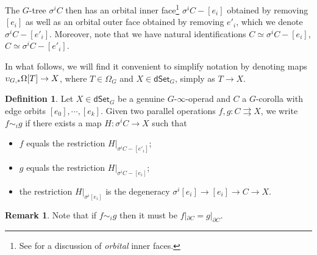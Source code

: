 \documentclass[a4paper,10pt
,draft
]{article}%
\numberwithin{equation}{section}
\numberwithin{figure}{section}
\theoremstyle{definition} %
\newtheorem{definition}[equation]{Definition}%
\newtheorem{remark}[equation]{Remark}%
\newcommand{\1}{\ensuremath{\mathbbm 1}}%
\begin{document}
The $G$-tree $\sigma^i C$ then has an orbital inner face\footnote{See \cite[Defn. 2.16]{BP_edss} for a discussion of \textit{orbital} inner faces.}
$\sigma^i C - [e_i]$ obtained by removing $[e_i]$
as well as an orbital outer face obtained by removing $e'_i$,
which we denote $\sigma^i C - [e'_i]$.
Moreover, note that we have natural identifications
$C \simeq \sigma^i C - [e_i]$,
$C \simeq \sigma^i C - [e'_i]$.


In what follows, we will find it convenient to simplify notation by denoting maps $\upsilon_{G,\**}\Omega[T] \to X$,
where $T \in \Omega_G$ and $X \in \mathsf{dSet}_G$,
simply as $T \to X$.


\begin{definition}\label{HOEQUIVS DEF}
	Let $X \in \mathsf{dSet}_G$ be a genuine $G$-$\infty$-operad and $C$ a $G$-corolla with edge orbits
	$[e_0],\cdots,[e_k]$.
%	
	Given two parallel operations 
	$f,g\colon C \rightrightarrows X$,
	we write $f \sim_i g$ if there exists a map
	$H \colon \sigma^i C \to X$ such that
\begin{itemize}
\item $f$ equals the restriction $H|_{\sigma^i C-[e'_i]}$;
\item $g$ equals the restriction $H|_{\sigma^i C-[e_i]}$;
\item the restriction $H|_{\sigma^i [e_i]}$
is the degeneracy $\sigma^i [e_i] \to [e_i] \to C \to X$.
\end{itemize}
\end{definition}


\begin{remark}\label{HOMOTBOUND REM}
	Note that if $f \sim_i g$ then it must be
	$f|_{\partial C} = g|_{\partial C}$.
\end{remark}
\end{document}
